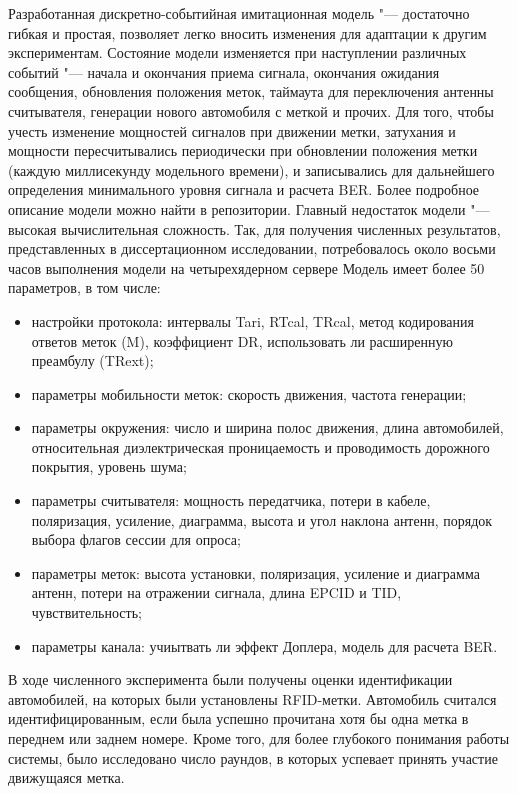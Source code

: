 Разработанная дискретно-событийная имитационная модель "--- достаточно гибкая и простая, позволяет легко вносить изменения для адаптации к другим экспериментам. Состояние модели изменяется при наступлении различных событий "--- начала и окончания приема сигнала, окончания ожидания сообщения, обновления положения меток, таймаута для переключения антенны считывателя, генерации нового автомобиля с меткой и прочих. Для того, чтобы учесть изменение мощностей сигналов при движении метки, затухания и мощности пересчитывались периодически при обновлении положения метки (каждую миллисекунду модельного времени), и записывались для дальнейшего определения минимального уровня сигнала и расчета BER. Более подробное описание модели можно найти в репозитории. Главный недостаток модели "--- высокая вычислительная сложность. Так, для получения численных результатов, представленных в диссертационном исследовании, потребовалось около восьми часов выполнения модели на четырехядерном сервере Модель имеет более 50 параметров, в том числе:
\begin{itemize}
	\item настройки протокола: интервалы Tari, RTcal, TRcal, метод кодирования ответов меток (M), коэффициент DR, использовать ли расширенную преамбулу (TRext);
	\item параметры мобильности меток: скорость движения, частота генерации;
	\item параметры окружения: число и ширина полос движения, длина автомобилей, относительная диэлектрическая проницаемость и проводимость дорожного покрытия, уровень шума;
	\item параметры считывателя: мощность передатчика, потери в кабеле, поляризация, усиление, диаграмма, высота и угол наклона антенн, порядок выбора флагов сессии для опроса;
	\item параметры меток: высота установки, поляризация, усиление и диаграмма антенн, потери на отражении сигнала, длина EPCID и TID, чувствительность;
	\item параметры канала: учиытвать ли эффект Доплера, модель для расчета BER.
\end{itemize}

В ходе численного эксперимента были получены оценки идентификации автомобилей, на которых были установлены RFID-метки. Автомобиль считался идентифицированным, если была успешно прочитана хотя бы одна метка в переднем или заднем номере. Кроме того, для более глубокого понимания работы системы, было исследовано число раундов, в которых успевает принять участие движущаяся метка.



